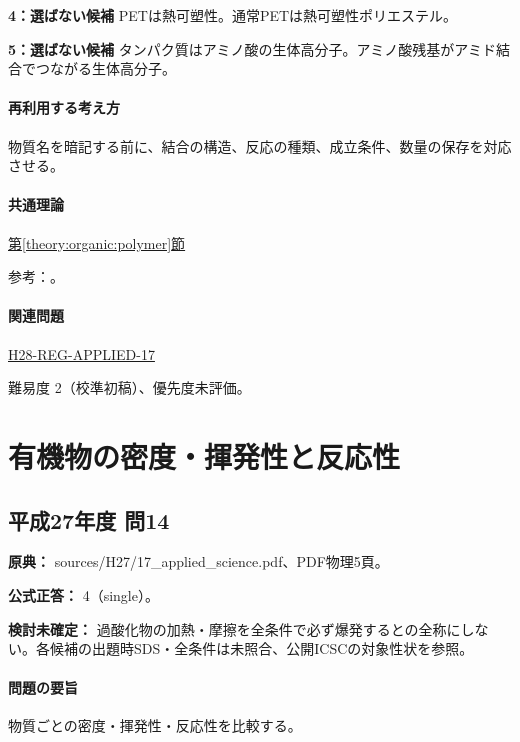 \noindent\textbf{4：選ばない候補} PETは熱可塑性。通常PETは熱可塑性ポリエステル。\par

\noindent\textbf{5：選ばない候補} タンパク質はアミノ酸の生体高分子。アミノ酸残基がアミド結合でつながる生体高分子。\par

\paragraph{再利用する考え方} 物質名を暗記する前に、結合の構造、反応の種類、成立条件、数量の保存を対応させる。

\paragraph{共通理論} \hyperref[theory:organic:polymer]{第\ref*{theory:organic:polymer}節}

\par 参考：\cite{organic_physical,organic_step,organic_jbpa}。

\paragraph{関連問題} \hyperref[q:h28-reg-applied-17]{H28-REG-APPLIED-17}

\par 難易度 2（校準初稿）、優先度未評価。

\section{有機物の密度・揮発性と反応性}

\subsection{平成27年度 問14}
\label{q:h27-reg-applied-14}

\noindent\textbf{原典：} sources/H27/17\_applied\_science.pdf、PDF物理5頁。

\textbf{公式正答：} 4（single）。

\par\textbf{検討未確定：} 過酸化物の加熱・摩擦を全条件で必ず爆発するとの全称にしない。各候補の出題時SDS・全条件は未照合、公開ICSCの対象性状を参照。

\paragraph{問題の要旨} 物質ごとの密度・揮発性・反応性を比較する。

